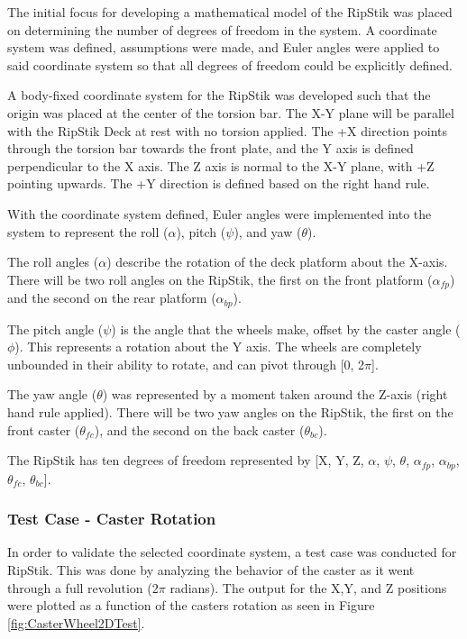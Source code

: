 The initial focus for developing a mathematical model of the RipStik was placed on determining the number of degrees of freedom in the system. 
A coordinate system was defined, assumptions were made, and Euler angles were applied to said coordinate system so that all degrees of freedom could be explicitly defined.
\par
A body-fixed coordinate system for the RipStik was developed such that the origin was placed at the center of the torsion bar. The X-Y plane will be parallel with the RipStik Deck at rest with no torsion applied.
The +X direction points through the torsion bar towards the front plate, and the Y axis is defined perpendicular to the X axis. The Z axis is normal to the X-Y plane, with +Z pointing upwards. The +Y direction is defined based on the right hand rule.

With the coordinate system defined, Euler angles were implemented into the system to represent the roll ($\alpha$), pitch ($\psi$), and yaw ($\theta$).
\par
The roll angles ($\alpha$) describe the rotation of the deck platform about the X-axis. There will be two roll angles on the RipStik, the first on the front platform ($\alpha_{fp}$) and the second on the rear platform ($\alpha_{bp}$).
\par
The pitch angle ($\psi$) is the angle that the wheels make, offset by the caster angle ($\phi$). This represents a rotation about the Y axis. The wheels are completely unbounded in their ability to rotate, and can pivot through [0, 2$\pi$].
\par
The yaw angle ($\theta$) was represented by a moment taken around the Z-axis (right hand rule applied). There will be two yaw angles on the RipStik, the first on the front caster ($\theta_{fc}$), and the second on the back caster ($\theta_{bc}$).

The RipStik has ten degrees of freedom represented by [X, Y, Z, $\alpha$, $\psi$, $\theta$, $\alpha_{fp}$, $\alpha_{bp}$, $\theta_{fc}$, $\theta_{bc}$].

\subsubsection{Test Case - Caster Rotation}

In order to validate the selected coordinate system, a test case was conducted for RipStik. This was done by analyzing the behavior of the caster as it went through a full revolution (2$\pi$ radians).
The output for the X,Y, and Z positions were plotted as a function of the casters rotation as seen in Figure \ref{fig:CasterWheel2DTest}.

